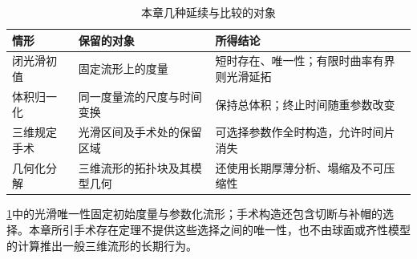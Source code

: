 \begin{table}[htbp]
	\centering
	\small
	\caption{本章几种延续与比较的对象}
	\label{g3:tab:ricci-flow-scope}
	\begin{tabularx}{\textwidth}{@{}l X X@{}}
		\toprule
		情形 & 保留的对象 & 所得结论 \\
		\midrule
		闭光滑初值 & 固定流形上的度量 & 短时存在、唯一性；有限时曲率有界则光滑延拓 \\
		体积归一化 & 同一度量流的尺度与时间变换 & 保持总体积；终止时间随重参数改变 \\
		三维规定手术 & 光滑区间及手术处的保留区域 & 可选择参数作全时构造，允许时间片消失 \\
		几何化分解 & 三维流形的拓扑块及其模型几何 & 还使用长期厚薄分析、塌缩及不可压缩性 \\
		\bottomrule
	\end{tabularx}
\end{table}

\cref{g3:tab:ricci-flow-scope}中的光滑唯一性固定初始度量与参数化流形；手术构造还包含切断与补帽的选择。本章所引手术存在定理不提供这些选择之间的唯一性，也不由球面或齐性模型的计算推出一般三维流形的长期行为。
